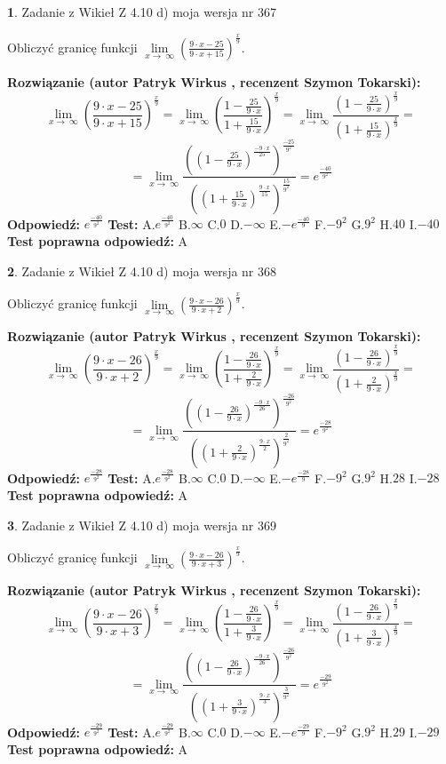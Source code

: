 \documentclass[12pt, a4paper]{article}
\theoremstyle{definition} %
\newtheorem{zad}{}
\newcommand{\zadStart}[1]{\begin{zad}#1\newline}
\newcommand{\zadStop}{\end{zad}}
\newcommand{\rozwStart}[2]{\noindent \textbf{Rozwiązanie (autor #1 , recenzent #2): }\newline}
\newcommand{\rozwStop}{\newline}
\newcommand{\odpStart}{\noindent \textbf{Odpowiedź:}\newline}
\newcommand{\odpStop}{\newline}
\newcommand{\testStart}{\noindent \textbf{Test:}\newline}
\newcommand{\testStop}{\newline}
\newcommand{\kluczStart}{\noindent \textbf{Test poprawna odpowiedź:}\newline}
\newcommand{\kluczStop}{\newline}
\begin{document}
\zadStart{Zadanie z Wikieł Z 4.10 d) moja wersja nr 367}


Obliczyć granicę funkcji  $\lim\limits_{x\to\ \infty}(\frac{9\cdot x-25}{9\cdot x+15})^{\frac{x}{9}}$.
\zadStop
\rozwStart{Patryk Wirkus}{Szymon Tokarski}
$$\lim\limits_{x\to\ \infty}(\frac{9\cdot x-25}{9\cdot x+15})^{\frac{x}{9}} = \lim\limits_{x\to\ \infty}(\frac{1-\frac{25}{9\cdot x}}{1+\frac{15}{9\cdot x}})^{\frac{x}{9}}=\lim\limits_{x\to\ \infty}\frac{(1-\frac{25}{9\cdot x})^{\frac{x}{9}}}{(1+\frac{15}{9\cdot x})^{\frac{x}{9}}}=$$
$$=\lim\limits_{x\to\ \infty}\frac{((1-\frac{25}{9\cdot x})^{\frac{-9\cdot x}{25}})^{\frac{-25}{9^{2}}}}{((1+\frac{15}{9\cdot x})^{\frac{9\cdot x}{15}})^{\frac{15}{9^{2}}}}=e^{\frac{-40}{9^{2}}}$$
\rozwStop
\odpStart
$e^{\frac{-40}{9^{2}}}$
\odpStop
\testStart
A.$e^{\frac{-40}{9^{2}}}$ B.$\infty$ C.$0$ D.$-\infty$ E.$-e^{\frac{-40}{9}}$
F.$-9^{2}$ G.$9^{2}$
H.$40$
I.$-40$
\testStop
\kluczStart
A
\kluczStop



\zadStart{Zadanie z Wikieł Z 4.10 d) moja wersja nr 368}


Obliczyć granicę funkcji  $\lim\limits_{x\to\ \infty}(\frac{9\cdot x-26}{9\cdot x+2})^{\frac{x}{9}}$.
\zadStop
\rozwStart{Patryk Wirkus}{Szymon Tokarski}
$$\lim\limits_{x\to\ \infty}(\frac{9\cdot x-26}{9\cdot x+2})^{\frac{x}{9}} = \lim\limits_{x\to\ \infty}(\frac{1-\frac{26}{9\cdot x}}{1+\frac{2}{9\cdot x}})^{\frac{x}{9}}=\lim\limits_{x\to\ \infty}\frac{(1-\frac{26}{9\cdot x})^{\frac{x}{9}}}{(1+\frac{2}{9\cdot x})^{\frac{x}{9}}}=$$
$$=\lim\limits_{x\to\ \infty}\frac{((1-\frac{26}{9\cdot x})^{\frac{-9\cdot x}{26}})^{\frac{-26}{9^{2}}}}{((1+\frac{2}{9\cdot x})^{\frac{9\cdot x}{2}})^{\frac{2}{9^{2}}}}=e^{\frac{-28}{9^{2}}}$$
\rozwStop
\odpStart
$e^{\frac{-28}{9^{2}}}$
\odpStop
\testStart
A.$e^{\frac{-28}{9^{2}}}$ B.$\infty$ C.$0$ D.$-\infty$ E.$-e^{\frac{-28}{9}}$
F.$-9^{2}$ G.$9^{2}$
H.$28$
I.$-28$
\testStop
\kluczStart
A
\kluczStop



\zadStart{Zadanie z Wikieł Z 4.10 d) moja wersja nr 369}


Obliczyć granicę funkcji  $\lim\limits_{x\to\ \infty}(\frac{9\cdot x-26}{9\cdot x+3})^{\frac{x}{9}}$.
\zadStop
\rozwStart{Patryk Wirkus}{Szymon Tokarski}
$$\lim\limits_{x\to\ \infty}(\frac{9\cdot x-26}{9\cdot x+3})^{\frac{x}{9}} = \lim\limits_{x\to\ \infty}(\frac{1-\frac{26}{9\cdot x}}{1+\frac{3}{9\cdot x}})^{\frac{x}{9}}=\lim\limits_{x\to\ \infty}\frac{(1-\frac{26}{9\cdot x})^{\frac{x}{9}}}{(1+\frac{3}{9\cdot x})^{\frac{x}{9}}}=$$
$$=\lim\limits_{x\to\ \infty}\frac{((1-\frac{26}{9\cdot x})^{\frac{-9\cdot x}{26}})^{\frac{-26}{9^{2}}}}{((1+\frac{3}{9\cdot x})^{\frac{9\cdot x}{3}})^{\frac{3}{9^{2}}}}=e^{\frac{-29}{9^{2}}}$$
\rozwStop
\odpStart
$e^{\frac{-29}{9^{2}}}$
\odpStop
\testStart
A.$e^{\frac{-29}{9^{2}}}$ B.$\infty$ C.$0$ D.$-\infty$ E.$-e^{\frac{-29}{9}}$
F.$-9^{2}$ G.$9^{2}$
H.$29$
I.$-29$
\testStop
\kluczStart
A
\kluczStop
\end{document}
